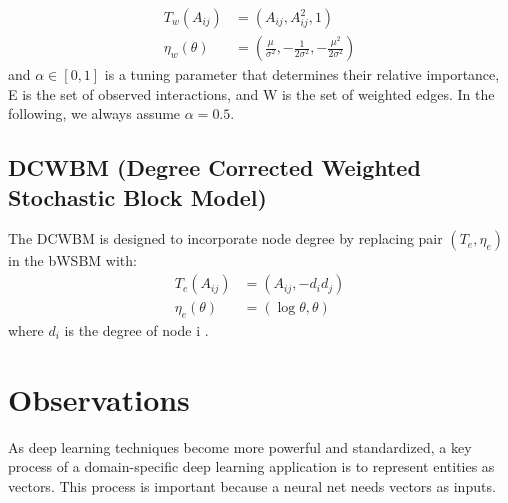 \documentclass[letterpaper]{article}
\begin{document}
\begin{align*}
T_w(A_{ij}) &= (A_{ij}, A_{ij}^2, 1)\\
\eta_w(\theta)
&= (\frac{\mu}{\sigma^2}, -\frac{1}{2\sigma^2}, -\frac{\mu^2}{2\sigma^2})
\end{align*}
and $ \alpha \in [0, 1]$ is a tuning parameter that determines their relative importance,
E is the set of observed interactions,
and W is the set of weighted edges.
In the following, we always assume $ \alpha = 0.5 $.

\subsection{DCWBM (Degree Corrected Weighted Stochastic Block Model)}
The DCWBM is designed to incorporate node degree
by replacing pair $ (T_e, \eta_e) $ in the bWSBM with:
\begin{align*}
	T_e(A_{ij}) &= (A_{ij}, -d_id_j)\\
	\eta_e(\theta) &= (\log\theta, \theta)
\end{align*}
where $ d_i $ is the degree of node i \cite{aicher2014learning}.


\section{Observations}
As deep learning techniques become more powerful and standardized,
a key process of a domain-specific deep learning application
is to represent entities as vectors.
This process is important because a neural net needs vectors as inputs.
\end{document}
